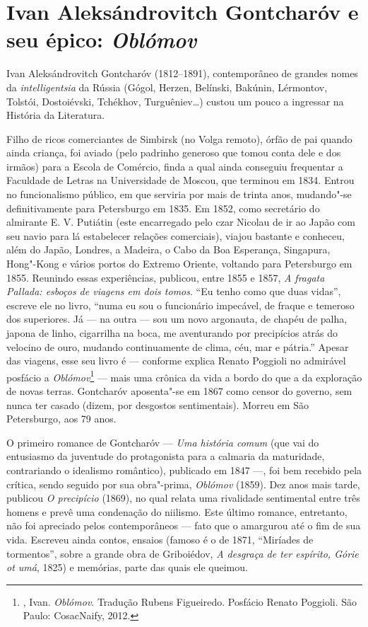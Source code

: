 \chapter{Ivan Aleksándrovitch Gontcharóv e seu épico: \emph{Oblómov}}

Ivan Aleksándrovitch Gontcharóv (1812--1891), contemporâneo de grandes
nomes da \emph{intelligentsia} da Rússia (Gógol, Herzen, Belínski,
Bakúnin, Lérmontov, Tolstói, Dostoiévski, Tchékhov,
Turguêniev\ldots{}) custou um pouco a ingressar na História da
Literatura. 

Filho de ricos comerciantes de Simbirsk (no Volga remoto), órfão de
pai quando ainda criança, foi aviado (pelo padrinho generoso que
tomou conta dele e dos irmãos) para a Escola de Comércio, finda a
qual ainda conseguiu frequentar a Faculdade de Letras na Universidade
de Moscou, que terminou em 1834. Entrou no funcionalismo público, em
que serviria por mais de trinta anos, mudando"-se definitivamente para
Petersburgo em 1835. Em 1852, como secretário do almirante E. V.
Putiátin (este encarregado pelo czar Nicolau  de ir ao
Japão com seu navio para lá estabelecer relações comerciais), viajou
bastante e conheceu, além do Japão, Londres, a Madeira, o Cabo da Boa
Esperança, Singapura, Hong"-Kong e vários portos do Extremo Oriente,
voltando para Petersburgo em 1855. Reunindo essas experiências,
publicou, entre 1855 e 1857, \emph{A fragata Pallada: esboços de
viagens em dois tomos}. ``Eu tenho como que duas vidas'', escreve
ele no livro, ``numa eu sou o funcionário impecável, de fraque e
temeroso dos superiores. Já --- na outra --- sou um novo argonauta,
de chapéu de palha, japona de linho, cigarrilha na boca, me
aventurando por precipícios atrás do velocino de ouro, mudando
continuamente de clima, céu, mar e pátria.'' Apesar das viagens,
esse seu livro é --- conforme explica Renato Poggioli no admirável
posfácio a \emph{Oblómov}\footnote{, Ivan.
\emph{Oblómov}. Tradução Rubens Figueiredo. Posfácio Renato Poggioli.
São Paulo: CosacNaify, 2012.} --- mais uma crônica da vida a bordo do
que a da exploração de novas terras. Gontcharóv aposenta"-se em 1867
como censor do governo, sem nunca ter casado (dizem, por desgostos
sentimentais). Morreu em São Petersburgo, aos 79 anos. 

O primeiro romance  de Gontcharóv --- \emph{Uma história comum} (que vai do entusiasmo da juventude do protagonista para a calmaria da maturidade, contrariando o idealismo romântico), publicado em 1847 ---, foi bem recebido pela crítica, sendo seguido por sua obra"-prima, \emph{Oblómov} (1859). Dez anos mais tarde, publicou \emph{O precipício} (1869), no qual relata uma rivalidade sentimental entre três homens e prevê uma condenação do niilismo. Este último romance, entretanto, não foi apreciado pelos contemporâneos --- fato que o amargurou até o fim de sua vida. Escreveu ainda contos, ensaios (famoso é o de 1871, ``Miríades de tormentos'', sobre a grande obra de Griboiédov, \emph{A desgraça de ter espírito, Górie ot umá}, 1825) e memórias, parte das quais ele queimou. 


